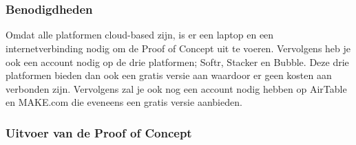 \chapter{}%
\label{ch:proof-of-concept}
\subsection{Benodigdheden}%
\label{subsec:benodigdheden}
Omdat alle platformen cloud-based zijn, is er een laptop en een internetverbinding nodig om de Proof of Concept uit te voeren. Vervolgens heb je ook 
een account nodig op de drie platformen; Softr, Stacker en Bubble. Deze drie platformen bieden dan ook een gratis versie aan waardoor er geen kosten aan verbonden zijn. Vervolgens zal je ook 
nog een account nodig hebben op AirTable en MAKE.com die eveneens een gratis versie aanbieden.

\subsection{Uitvoer van de Proof of Concept}%
\label{subsec:uitvoer-proof-of-concept}

